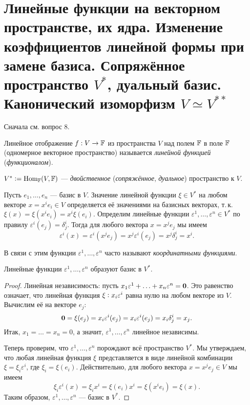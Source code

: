 \section{Линейные функции на векторном пространстве, их ядра. Изменение коэффициентов линейной формы при замене базиса. Сопряжённое пространство $V^\ast$, дуальный базис. Канонический изоморфизм $V \simeq V^{\ast\ast}$}

Сначала см. вопрос 8.

\begin{definition}
    Линейное отображение $f: V \to \mathbb{F}$ из пространства $V$ над полем $\mathbb{F}$ в поле $\mathbb{F}$ (одномерное векторное пространство) называется \textit{линейной функцией} (\textit{функционалом}).
\end{definition}

\begin{definition}
    $V^\ast \vcentcolon = \operatorname{Hom}_{\mathbb{F}}(V, \mathbb{F})$ --- \textit{двойственное} (\textit{сопряжённое}, \textit{дуальное}) пространство к $V$.
\end{definition}

Пусть $e_1, \ldots, e_n$ --- базис в $V$. Значение линейной функции $\xi \in V^\ast$ на любом векторе $x = x^ie_i \in V$ определяется её значениями на базисных векторах, т.\,к. $\xi(x) = \xi(x^ie_i) = x^i\xi(e_i)$. Определим линейные функции $\varepsilon^1, \ldots, \varepsilon^n \in V^\ast$ по правилу $\varepsilon^i(e_j) = \delta^i_j$. Тогда для любого вектора $x = x^je_j$ мы имеем
\[
    \varepsilon^i(x) = \varepsilon^i(x^je_j) = x^j\varepsilon^i(e_j) = x^j\delta^i_j = x^i.
\]

\begin{definition}
    В связи с этим функции $\varepsilon^1, \ldots, \varepsilon^n$ часто называют \textit{координатными функциями}.
\end{definition}

\begin{proposal}
    Линейные функции $\varepsilon^1, \ldots, \varepsilon^n$ образуют базис в $V^\ast$.
\end{proposal}

\begin{proof}
    Линейная независимость: пусть $x_1\varepsilon^1 + \ldots + x_n\varepsilon^n = \boldsymbol{0}$. Это равенство означает, что линейная функция $\xi \vcentcolon x_i\varepsilon^i$ равна нулю на любом векторе из $V$. Вычислим её на векторе $e_j$:
    \[
        \boldsymbol{0} = \xi(e_j) = x_i\varepsilon^i(e_j) = x_i\varepsilon^i(e_j) = x_i\delta^i_j = x_j.
    \]
    Итак, $x_1 = \ldots = x_n = 0$, а значит, $\varepsilon^1, \ldots, \varepsilon^n$ линейное независимы.

    Теперь проверим, что $\varepsilon^1, \ldots, \varepsilon^n$ порождают всё пространство $V^\ast$. Мы утверждаем, что любая линейная функция $\xi$ представляется в виде линейной комбинации $\xi = \xi_i\varepsilon^i$, где $\xi_i = \xi(e_i)$. Действительно, для любого вектора $x = x^je_j \in V$ мы имеем
    \[
        \xi_i\varepsilon^i(x) = \xi_i x^i = \xi(e_i)x^i = \xi(x^ie_i) = \xi(x).
    \]
    Таким образом, $\varepsilon^1, \ldots, \varepsilon^n$ --- базис в $V^\ast$.
\end{proof}

